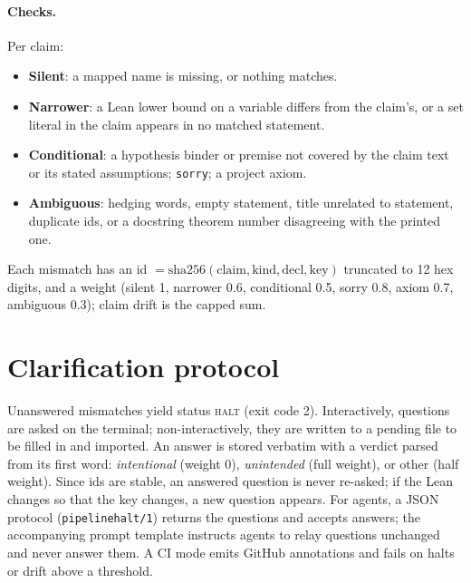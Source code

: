 \documentclass[11pt]{article}
\begin{document}
\paragraph{Checks.} Per claim:
\begin{itemize}
\item \textbf{Silent}: a mapped name is missing, or nothing matches.
\item \textbf{Narrower}: a Lean lower bound on a variable differs from the claim's, or a set literal in the claim appears in no matched statement.
\item \textbf{Conditional}: a hypothesis binder or premise not covered by the claim text or its stated assumptions; \texttt{sorry}; a project axiom.
\item \textbf{Ambiguous}: hedging words, empty statement, title unrelated to statement, duplicate ids, or a docstring theorem number disagreeing with the printed one.
\end{itemize}
Each mismatch has an id $=\mathrm{sha256}(\text{claim},\text{kind},\text{decl},\text{key})$ truncated to 12 hex digits, and a weight (silent 1, narrower 0.6, conditional 0.5, sorry 0.8, axiom 0.7, ambiguous 0.3); claim drift is the capped sum.

\section{Clarification protocol}
Unanswered mismatches yield status \textsc{halt} (exit code 2). Interactively, questions are asked on the terminal; non-interactively, they are written to a pending file to be filled in and imported. An answer is stored verbatim with a verdict parsed from its first word: \emph{intentional} (weight 0), \emph{unintended} (full weight), or other (half weight). Since ids are stable, an answered question is never re-asked; if the Lean changes so that the key changes, a new question appears. For agents, a JSON protocol (\texttt{pipelinehalt/1}) returns the questions and accepts answers; the accompanying prompt template instructs agents to relay questions unchanged and never answer them. A CI mode emits GitHub annotations and fails on halts or drift above a threshold.
\end{document}
